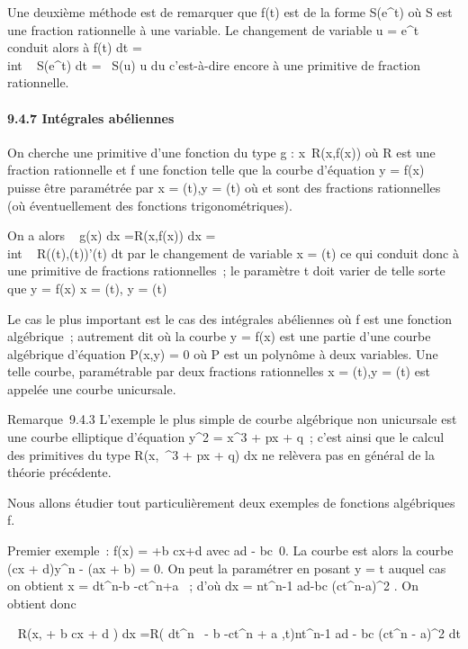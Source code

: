 \documentclass[]{article}
\begin{document}
Une deuxième méthode est de remarquer que f(t) est de la forme
S(e^t) où S est une fraction rationnelle à une variable. Le
changement de variable u = e^t conduit alors à
\int  f(t) dt =\\int ~
S(e^t) dt =\int ~  S(u)
\over u du c'est-à-dire encore à une primitive de
fraction rationnelle.

\paragraph{9.4.7 Intégrales abéliennes}

On cherche une primitive d'une fonction du type g :
x\mapsto~R(x,f(x)) où R est une fraction rationnelle
et f une fonction telle que la courbe d'équation y = f(x) puisse être
paramétrée par x = \phi(t),y = \psi(t) où \phi et \psi sont des fractions
rationnelles (où éventuellement des fonctions trigonométriques).

On a alors \int ~ g(x) dx
=\int  R(x,f(x)) dx =\\int ~
R(\phi(t),\psi(t))\phi'(t) dt par le changement de variable x = \phi(t) ce qui
conduit donc à une primitive de fractions rationnelles~; le paramètre t
doit varier de telle sorte que y = f(x) \Leftrightarrow x =
\phi(t), y = \psi(t)

Le cas le plus important est le cas des intégrales abéliennes où f est
une fonction algébrique~; autrement dit où la courbe y = f(x) est une
partie d'une courbe algébrique \Gamma d'équation P(x,y) = 0 où P est un
polynôme à deux variables. Une telle courbe, paramétrable par deux
fractions rationnelles x = \phi(t),y = \psi(t) est appelée une courbe
unicursale.

Remarque~9.4.3 L'exemple le plus simple de courbe algébrique non
unicursale est une courbe elliptique d'équation y^2 =
x^3 + px + q~; c'est ainsi que le calcul des primitives du
type \int  R(x,\sqrtx~^3
 + px + q) dx ne relèvera pas en général de la théorie précédente.

Nous allons étudier tout particulièrement deux exemples de fonctions
algébriques f.

Premier exemple~: f(x) = \rootn
\ofax+b \over cx+d  avec ad -
bc\neq~0. La courbe \Gamma est alors la courbe (cx +
d)y^n - (ax + b) = 0. On peut la paramétrer en posant y = t
auquel cas on obtient x = dt^n-b \over
-ct^n+a ~; d'où dx = nt^n-1 ad-bc
\over (ct^n-a)^2 . On obtient
donc

\int ~ R(x,\rootn
\ofax + b \over cx + d ) dx
=\int  R( dt^n~ - b
\over -ct^n + a ,t)nt^n-1 ad -
bc \over (ct^n - a)^2 dt
\end{document}
